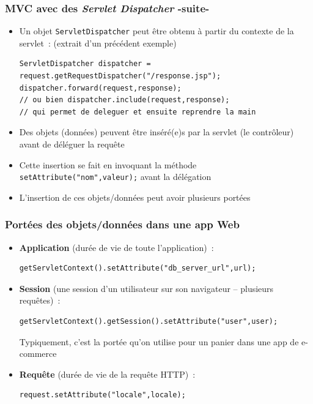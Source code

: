 \documentclass{beamer}
\begin{document}
\begin{frame}[fragile]
	\frametitle{MVC avec des \textit{Servlet Dispatcher} -suite-}
	\begin{itemize}
		\item Un objet \texttt{ServletDispatcher} peut être obtenu à partir du contexte de la servlet~: (extrait d'un précédent exemple)
\begin{lstlisting}
ServletDispatcher dispatcher = request.getRequestDispatcher("/response.jsp");
dispatcher.forward(request,response);
// ou bien dispatcher.include(request,response);
// qui permet de deleguer et ensuite reprendre la main
\end{lstlisting}
	\item Des objets (données) peuvent être inséré(e)s par la servlet (le contrôleur) avant de déléguer la requête
	\item Cette insertion se fait en invoquant la méthode \texttt{setAttribute("nom",valeur);} avant la délégation
	\item L'insertion de ces objets/données peut avoir plusieurs portées
	\end{itemize}
\end{frame}

\begin{frame}[fragile]
	\frametitle{Portées des objets/données dans une app Web}
	\begin{itemize}
		\item \textbf{Application} (durée de vie de toute l'application)~:
\begin{lstlisting}
getServletContext().setAttribute("db_server_url",url);
\end{lstlisting}
		\item \textbf{Session} (une session d'un utilisateur sur son navigateur -- plusieurs requêtes)~:
\begin{lstlisting}
getServletContext().getSession().setAttribute("user",user);	
\end{lstlisting}			
		Typiquement, c'est la portée qu'on utilise pour un panier dans une app de e-commerce 
		\item \textbf{Requête} (durée de vie de la requête HTTP)~:\\
\begin{lstlisting}
request.setAttribute("locale",locale);	
\end{lstlisting}					
	\end{itemize}
\end{frame}
\end{document}
